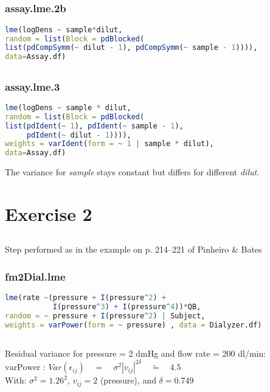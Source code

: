\documentclass[a4paper,12pt]{article}
\begin{document}
	\newpage
	\subsection{}
	\subsubsection*{assay.lme.2b}
	\begin{lstlisting}[language=R]
lme(logDens ~ sample*dilut, 
random = list(Block = pdBlocked(
list(pdCompSymm(~ dilut - 1), pdCompSymm(~ sample - 1)))),
data=Assay.df)
	\end{lstlisting}

	\subsection{}
	\subsubsection*{assay.lme.3}
	\begin{lstlisting}[language=R]
lme(logDens ~ sample * dilut, 
random = list(Block = pdBlocked(
list(pdIdent(~ 1), pdIdent(~ sample - 1), 
     pdIdent(~ dilut - 1)))),
weights = varIdent(form = ~ 1 | sample * dilut),
data=Assay.df)
	\end{lstlisting}

	The variance for \textit{sample} stays constant but differs for different \textit{dilut}.
	
	\section{Exercise 2}
	\subsection{}
	Step performed as in the example on p. 214–221 of Pinheiro \& Bates
	\subsubsection*{fm2Dial.lme}
	\begin{lstlisting}[language=R]
lme(rate ~(pressure + I(pressure^2) +
           I(pressure^3) + I(pressure^4))*QB,
random = ~ pressure + I(pressure^2) | Subject,
weights = varPower(form = ~ pressure) , data = Dialyzer.df)
	\end{lstlisting}
	
	\subsection{}
	Residual variance for pressure = 2 dmHg and flow rate = 200 dl/min:\\[1em]
	$\text{varPower : }Var\left(\epsilon_{ij}\right) \quad=\quad \sigma^2 |v_{ij}|^{2\delta} \quad\tilde{=}\quad 4.5$\\[1em]
	With: $\sigma^2 = 1.26^2$, $v_{ij} = 2$ (pressure), and $\delta = 0.749$\\[1em]
	
\end{document}

